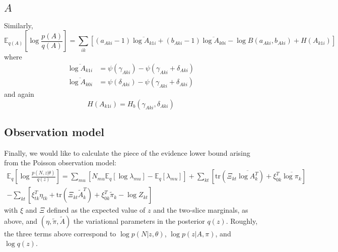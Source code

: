 \documentclass[11pt]{article}
\begin{document}
\subsection{$A$} 
Similarly,
\begin{equation}
    \mathbb{E}_{q(A)} \left[\log \frac{p(A)}{q(A)} \right] = 
\sum_{ik} \left[ (a_{Aki} - 1) \overline{\log A_{k1i}} + (b_{Aki} - 1) \overline{\log A_{k0i}} - \log B(a_{Aki}, b_{Aki}) + H(A_{k1i}) \right]
\end{equation}
where 
\begin{align}
    \overline{\log A_{k1i}} &= \psi(\gamma_{Aki}) - \psi(\gamma_{Aki} + \delta_{Aki}) \\
    \overline{\log A_{k0i}} &= \psi(\delta_{Aki}) - \psi(\gamma_{Aki} + \delta_{Aki})
\end{align}
and again
\begin{equation}
    H(A_{k1i}) = H_b(\gamma_{Aki}, \delta_{Aki})
\end{equation}

\subsection{Observation model}
Finally, we would like to calculate the piece of the evidence lower bound arising from the Poisson observation model:
\begin{multline}
    \mathbb{E}_q \left[ \log \frac{p(N, z|\theta)}{q(z)} \right] =
    \sum_{mu} \left[
    N_{mu} \mathbb{E}_q [\log \lambda_{mu}]
    - \mathbb{E}_q[\lambda_{mu}] \right]
    + \sum_{kt} \left[\mathrm{tr}\left(\Xi_{kt} \overline{\log A_k^T}\right) + \xi_{0k}^T \overline{\log \pi_k} \right] \\
    - \sum_{kt} \left[ \xi_{tk}^T \eta_{tk} + \mathrm{tr}\left(\Xi_{kt} \tilde{A}_k^T\right) + \xi_{0k}^T \tilde{\pi}_k - \log Z_{kt} \right]
\end{multline}
with $\xi$ and $\Xi$ defined as the expected value of $z$ and the two-slice marginals, as above, and $(\eta, \tilde{\pi}, \tilde{A})$ the variational parameters in the posterior $q(z)$. Roughly, the three terms above correspond to $\log p(N|z, \theta)$, $\log p(z|A, \pi)$, and $\log q(z)$.
\end{document}
